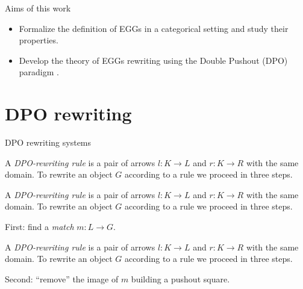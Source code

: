 \documentclass{beamer}
\begin{document}
\begin{frame}{Aims of this work} 
    \begin{itemize}
        \item Formalize the definition of EGGs in a categorical setting and study their properties. \pause \medskip 
        \item Develop the theory of EGGs rewriting using the Double Pushout (DPO) paradigm \cite{ehrig2006fundamentals,ehrig1999handbook}.
    \end{itemize}
\end{frame}

\section{DPO rewriting}

\begin{frame}{DPO rewriting systems} 
	\begin{overprint}

		
		A \emph{DPO-rewriting rule} is a pair of arrows $l:K\to L$ and $r:K\to R$ with the same domain. To rewrite an object $G$ according to a rule we proceed in three steps.
		
		
	A \emph{DPO-rewriting rule} is a pair  of arrows $l:K\to L$ and $r:K\to R$ with the same domain. To rewrite an object $G$ according to a rule we proceed in three steps.
		
		\medskip
		First: find a \emph{match} $m:L\to G$.
		\begin{center}
		\end{center}
		
		
		
		A \emph{DPO-rewriting rule} is a pair  of arrows $l:K\to L$ and $r:K\to R$ with the same domain. To rewrite an object $G$ according to a rule we proceed in three steps.		
		
		\medskip
		Second: ``remove'' the image of $m$  building a pushout square. \vspace{-0.075cm}
		\begin{center}
		\end{center}		
		

\end{overprint}
\end{frame}
\end{document}

